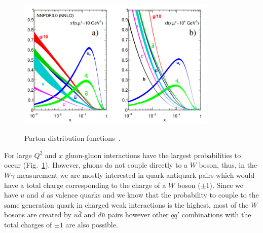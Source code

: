 \begin{figure}[htb]
  \begin{center}
    {\includegraphics[width=0.85\textwidth]{../figs/Intro/pdfs.png}}
    \caption{Parton distribution functions~\cite{ref_PDG}.}
    \label{fig:pdfs}
  \end{center}
\end{figure}

For large $Q^2$ and $x$ gluon-gluon interactions have the largest probabilities to occur (Fig.~\ref{fig:pdfs}). However, gluons do not couple directly to a $W$ boson, thus, in the $W\gamma$ measurement we are mostly interested in quark-antiquark pairs which would have a total charge corresponding to the charge of a $W$ boson ($\pm 1$). Since we have $u$ and $d$ as valence quarks and we know that the probability to couple to the same generation quark in charged weak interactions is the highest, most of the $W$ bosons are created by $u\bar{d}$ and $d\bar{u}$ pairs however other $q\bar{q'}$ combinations with the total charges of $\pm 1$ are also possible. %



